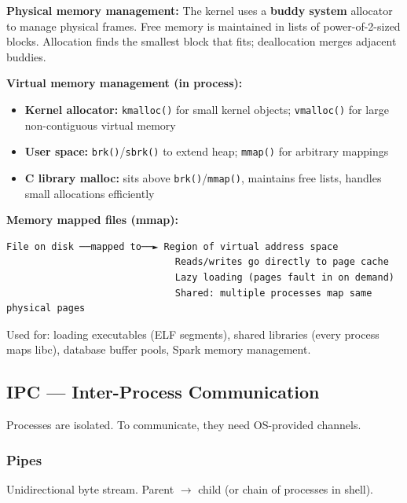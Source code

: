 \documentclass[11pt]{article}
\providecommand{\tightlist}{\setlength{\itemsep}{1pt}\setlength{\parskip}{0pt}}
\begin{document}
\textbf{Physical memory management:} The kernel uses a \textbf{buddy system} allocator to manage physical frames. Free memory is maintained in lists of power-of-2-sized blocks. Allocation finds the smallest block that fits; deallocation merges adjacent buddies.

\textbf{Virtual memory management (in process):}

\begin{itemize}
\tightlist
\item
  \textbf{Kernel allocator:} \texttt{kmalloc()} for small kernel objects; \texttt{vmalloc()} for large non-contiguous virtual memory
\item
  \textbf{User space:} \texttt{brk()}/\texttt{sbrk()} to extend heap; \texttt{mmap()} for arbitrary mappings
\item
  \textbf{C library malloc:} sits above \texttt{brk()}/\texttt{mmap()}, maintains free lists, handles small allocations efficiently
\end{itemize}

\textbf{Memory mapped files (mmap):}

\setcodelang{}

\begin{verbatim}
File on disk ──mapped to──► Region of virtual address space
                              Reads/writes go directly to page cache
                              Lazy loading (pages fault in on demand)
                              Shared: multiple processes map same physical pages
\end{verbatim}

Used for: loading executables (ELF segments), shared libraries (every process maps libc), database buffer pools, Spark memory management.

\subsection{IPC --- Inter-Process Communication}\label{ipc--inter-process-communication}

Processes are isolated. To communicate, they need OS-provided channels.

\subsubsection{Pipes}\label{pipes}

Unidirectional byte stream. Parent \(\rightarrow\) child (or chain of processes in shell).

\setcodelang{}
\end{document}
